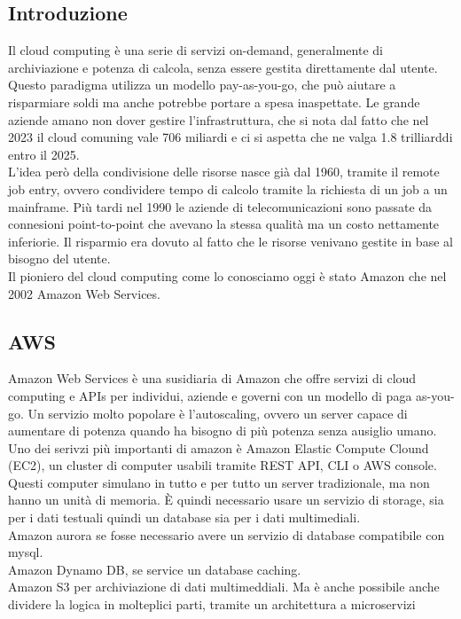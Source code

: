 \documentclass[12pt]{article}
\begin{document}
\subsection{Introduzione}
Il cloud computing è una serie di servizi on-demand, generalmente di archiviazione 
e potenza di calcola, senza essere gestita direttamente dal utente. 
Questo paradigma utilizza un modello pay-as-you-go, che può aiutare a risparmiare 
soldi ma anche potrebbe portare a spesa inaspettate. 
Le grande aziende amano non dover gestire l'infrastruttura, che si nota dal fatto 
che nel 2023 il cloud comuning vale 706 miliardi e ci si aspetta che ne valga 
1.8 trilliarddi entro il 2025.
\\ L'idea però della condivisione delle risorse nasce già dal 1960, tramite il 
remote job entry, ovvero condividere tempo di calcolo tramite la richiesta 
di un job a un mainframe. 
Più tardi nel 1990 le aziende di telecomunicazioni sono passate da connesioni 
point-to-point che avevano la stessa qualità ma un costo nettamente inferiorie.
Il risparmio era dovuto al fatto che le risorse venivano gestite in base 
al bisogno del utente. 
\\ Il pioniero del cloud computing come lo conosciamo oggi è stato Amazon che 
nel 2002 Amazon Web Services.

\subsection{AWS}
Amazon Web Services è una susidiaria di Amazon che offre servizi di cloud 
computing e APIs per individui, aziende e governi con un modello di paga as-you-go.
Un servizio molto popolare è l'autoscaling, ovvero un server capace di aumentare 
di potenza quando ha bisogno di più potenza senza ausiglio umano. 
Uno dei serivzi più importanti di amazon è Amazon Elastic Compute Clound (EC2), 
un cluster di computer usabili tramite REST API, CLI o AWS console. Questi 
computer simulano in tutto e per tutto un server tradizionale, ma non hanno 
un unità di memoria. 
È quindi necessario usare un servizio di storage, sia per i dati testuali 
quindi un database sia per i dati multimediali. 
\\ Amazon aurora se fosse necessario avere un servizio di database compatibile 
con mysql. 
\\ Amazon Dynamo DB, se service un database caching. 
\\ Amazon S3 per archiviazione di dati multimeddiali.
Ma è anche possibile anche dividere la logica in molteplici parti, tramite un 
architettura a microservizi
\end{document}
